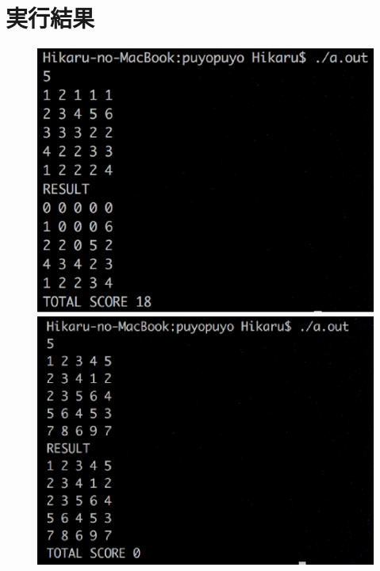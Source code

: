 \documentclass{jarticle}
\begin{document}
\section{実行結果}
\begin{figure}[!h]
\begin{center}
\includegraphics[scale=0.38]{c_result1.eps}
\includegraphics[scale=0.565]{c_result2.eps}
\newpage

\end{center}
\end{figure}
\end{document}
